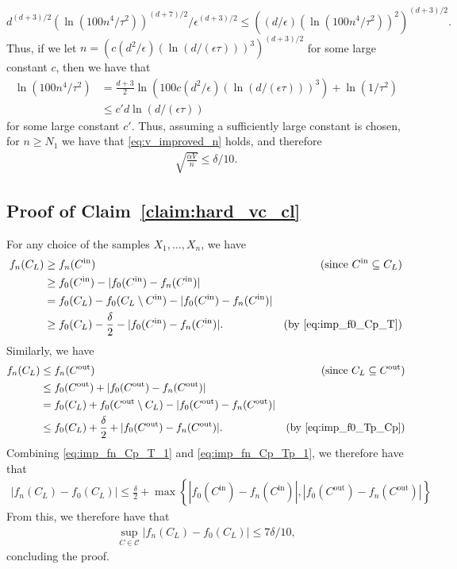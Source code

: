 \documentclass[final,12pt]{colt2018}
\newcommand{\nnew}[1]{{\color{red} #1}}
\newcommand{\nnew}[1]{#1}
\newtheorem{informal theorem}[theorem]{Theorem (informal statement)}
\newcommand{\eps}{\epsilon}
\newcommand{\cin}{C^\mathrm{in}}
\newcommand{\cout}{C^\mathrm{out}}
\begin{document}
\[
d^{(d+3)/2} (\ln(100 n^4/\tau^2))^{(d+7)/2} / \eps^{(d+3)/2} \leq \left( (d/\eps) (\ln(100 n^4/\tau^2))^{2} \right)^{(d+3)/2}.
\] 
Thus, if we let $n = (c (d^{2}/\eps) (\ln(d/(\eps\tau)))^{3})^{(d+3)/2}$ for some large constant $c$, then we have that
\begin{align*}
\ln(100 n^4/\tau^2) 
&= \frac{d+3}{2} \ln(100c (d^{2}/\eps) (\ln(d/(\eps\tau)))^{3}) + \ln(1/\tau^2) \\
&\leq c' d \ln(d/(\eps\tau))
\end{align*}
for some large constant $c'$.
Thus, assuming a sufficiently large constant is chosen, for $n \geq N_1$ we have that \eqref{eq:v_improved_n} holds, and therefore
\begin{align}
\sqrt{\frac{\alpha V}{n}} \leq \delta / 10. \label{eq:improved_expect}
\end{align}


\subsection{ {Proof of Claim~\ref{claim:hard_vc_cl}}}
\nnew{
For any choice of the samples  {$X_1,\ldots,X_n$}, we have
\begin{align}
f_n(C_L) &\geq f_n(\cin) & \text{(since $\cin \subseteq C_L$)} \notag \\
 &\geq f_0(\cin) - |f_0(\cin)-f_n(\cin)| \notag \\
 &= f_0(C_L) - f_0(C_L\setminus \cin) - |f_0(\cin)-f_n(\cin)| \notag \\
 &\geq f_0(C_L) - \frac{\delta}{2} - |f_0(\cin)-f_n(\cin)|. & \text{(by  \eqref{eq:imp_f0_Cp_T})} \label{eq:imp_fn_Cp_T_1}
\end{align}
Similarly, we have
\begin{align}
f_n(C_L) &\leq f_n(\cout) & \text{(since $C_L\subseteq \cout$)} \notag \\
 &\leq f_0(\cout) + |f_0(\cout)-f_n(\cout)| \notag \\
 &= f_0(C_L) + f_0(\cout\setminus C_L) - |f_0(\cout)-f_n(\cout)| \notag \\
 &\leq f_0(C_L) + \frac{\delta}{2} + |f_0(\cout)-f_n(\cout)|. & \text{(by  \eqref{eq:imp_f0_Tp_Cp})} \label{eq:imp_fn_Cp_Tp_1}
\end{align}
Combining \eqref{eq:imp_fn_Cp_T_1} and \eqref{eq:imp_fn_Cp_Tp_1}, we therefore have that
\begin{align*}
|f_n(C_L) - f_0(C_L)| \leq \frac{\delta}{2} + \max\left\{ |f_0(\cin)-f_n(\cin)|, |f_0(\cout)-f_n(\cout)| \right\} \label{eq:fn_f0_max}
\end{align*}
From this, we therefore have that
\begin{align*}
\sup_{C \in \mathcal{C} } |f_n(C_L)-f_0(C_L)| \leq 7\delta/10,
\end{align*}
concluding the proof.
}
\end{document}
